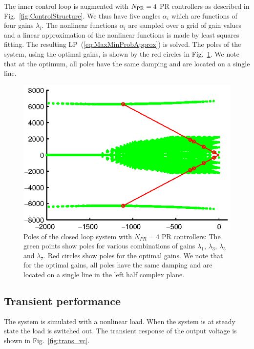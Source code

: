 \documentclass[conference,10pt]{IEEEtran}
\begin{document}
The inner control loop is augmented with $N_{\rm PR} = 4$ PR controllers as described in Fig.~\ref{fig:ControlStructure}. We thus have five
angles $\alpha_i$ which are functions of four gains
$\lambda_i$. The nonlinear functions $\alpha_i$ are sampled over a grid of gain values and a linear approximation of the nonlinear functions is made by least squares fitting. The resulting LP~(\ref{eq:MaxMinProbApprox}) is solved. The poles of the system, using the optimal gains, is shown by the red circles in Fig.~\ref{fig:PolesOptimalExample}.
We note that at the optimum, all poles have the same damping and are located on a single line. %
\begin{figure}[!h]
\centering

\includegraphics{fig/root_locus}
\caption{Poles of the closed loop system with $N_{PR}=4$ PR controllers: The green points show poles for various combinations of gains $\lambda_1$, $\lambda_3$, $\lambda_5$ and $\lambda_7$. Red circles show poles for the optimal gains.
We note that for the optimal gains, all poles have the same damping and are located on a single line in the left half complex plane.
}
\label{fig:PolesOptimalExample}
\end{figure}


\subsection{Transient performance}
The system is simulated with a nonlinear load. When the system is at steady state the load is switched out.
The transient response of the output voltage is shown in
Fig.~\ref{fig:trans_vc}.
\end{document}
